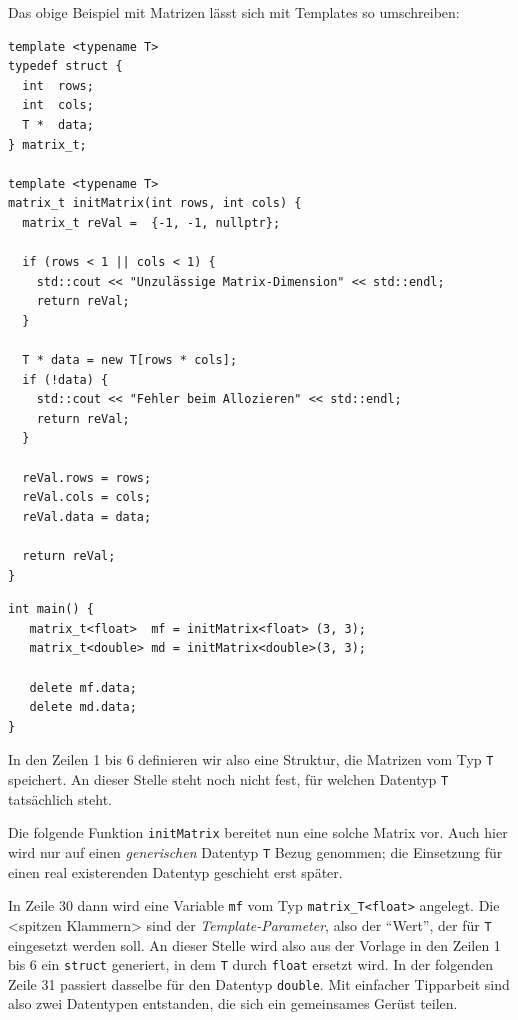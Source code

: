 Das obige Beispiel mit Matrizen lässt sich mit Templates so umschreiben:
\begin{codebox}
\begin{verbatim}
template <typename T>
typedef struct {
  int  rows;
  int  cols;
  T *  data;
} matrix_t;

template <typename T>
matrix_t initMatrix(int rows, int cols) {
  matrix_t reVal =  {-1, -1, nullptr};
  
  if (rows < 1 || cols < 1) {
    std::cout << "Unzulässige Matrix-Dimension" << std::endl;
    return reVal;
  }
  
  T * data = new T[rows * cols];
  if (!data) {
    std::cout << "Fehler beim Allozieren" << std::endl;
    return reVal;
  }
  
  reVal.rows = rows;
  reVal.cols = cols;
  reVal.data = data;
  
  return reVal;
}
\end{verbatim}
\end{codebox}

\begin{codebox}[]
\begin{verbatim}
int main() {
   matrix_t<float>  mf = initMatrix<float> (3, 3);
   matrix_t<double> md = initMatrix<double>(3, 3);
   
   delete mf.data;
   delete md.data;
}
\end{verbatim}
\end{codebox}

In den Zeilen 1 bis 6 definieren wir also eine Struktur, die Matrizen vom Typ \texttt{T} speichert. An dieser Stelle steht noch nicht fest, für welchen Datentyp \texttt{T} tatsächlich steht.

Die folgende Funktion \texttt{initMatrix} bereitet nun eine solche Matrix vor. Auch hier wird nur auf einen \emph{generischen} Datentyp \texttt{T} Bezug genommen; die Einsetzung für einen real existerenden Datentyp geschieht erst später.

In Zeile 30 dann wird eine Variable \texttt{mf} vom Typ \texttt{matrix_T<float>} angelegt. Die <spitzen Klammern> sind der \emph{Template-Parameter}, also der \enquote{Wert}, der für \texttt{T} eingesetzt werden soll. An dieser Stelle wird also aus der Vorlage in den Zeilen 1 bis 6 ein \texttt{struct} generiert, in dem \texttt{T} durch \texttt{float} ersetzt wird. In der folgenden Zeile 31 passiert dasselbe für den Datentyp \texttt{double}. Mit einfacher Tipparbeit sind also zwei Datentypen entstanden, die sich ein gemeinsames Gerüst teilen.

